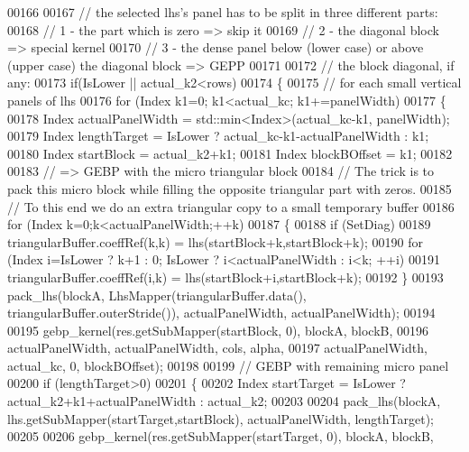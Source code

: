 \begin{DoxyCode}
00166 
00167       \textcolor{comment}{// the selected lhs's panel has to be split in three different parts:}
00168       \textcolor{comment}{//  1 - the part which is zero => skip it}
00169       \textcolor{comment}{//  2 - the diagonal block => special kernel}
00170       \textcolor{comment}{//  3 - the dense panel below (lower case) or above (upper case) the diagonal block => GEPP}
00171 
00172       \textcolor{comment}{// the block diagonal, if any:}
00173       \textcolor{keywordflow}{if}(IsLower || actual\_k2<rows)
00174       \{
00175         \textcolor{comment}{// for each small vertical panels of lhs}
00176         \textcolor{keywordflow}{for} (Index k1=0; k1<actual\_kc; k1+=panelWidth)
00177         \{
00178           Index actualPanelWidth = std::min<Index>(actual\_kc-k1, panelWidth);
00179           Index lengthTarget = IsLower ? actual\_kc-k1-actualPanelWidth : k1;
00180           Index startBlock   = actual\_k2+k1;
00181           Index blockBOffset = k1;
00182 
00183           \textcolor{comment}{// => GEBP with the micro triangular block}
00184           \textcolor{comment}{// The trick is to pack this micro block while filling the opposite triangular part with zeros.}
00185           \textcolor{comment}{// To this end we do an extra triangular copy to a small temporary buffer}
00186           \textcolor{keywordflow}{for} (Index k=0;k<actualPanelWidth;++k)
00187           \{
00188             \textcolor{keywordflow}{if} (SetDiag)
00189               triangularBuffer.coeffRef(k,k) = lhs(startBlock+k,startBlock+k);
00190             \textcolor{keywordflow}{for} (Index i=IsLower ? k+1 : 0; IsLower ? i<actualPanelWidth : i<k; ++i)
00191               triangularBuffer.coeffRef(i,k) = lhs(startBlock+i,startBlock+k);
00192           \}
00193           pack\_lhs(blockA, LhsMapper(triangularBuffer.data(), triangularBuffer.outerStride()), 
      actualPanelWidth, actualPanelWidth);
00194 
00195           gebp\_kernel(res.getSubMapper(startBlock, 0), blockA, blockB,
00196                       actualPanelWidth, actualPanelWidth, cols, alpha,
00197                       actualPanelWidth, actual\_kc, 0, blockBOffset);
00198 
00199           \textcolor{comment}{// GEBP with remaining micro panel}
00200           \textcolor{keywordflow}{if} (lengthTarget>0)
00201           \{
00202             Index startTarget  = IsLower ? actual\_k2+k1+actualPanelWidth : actual\_k2;
00203 
00204             pack\_lhs(blockA, lhs.getSubMapper(startTarget,startBlock), actualPanelWidth, lengthTarget);
00205 
00206             gebp\_kernel(res.getSubMapper(startTarget, 0), blockA, blockB,

\end{DoxyCode}
